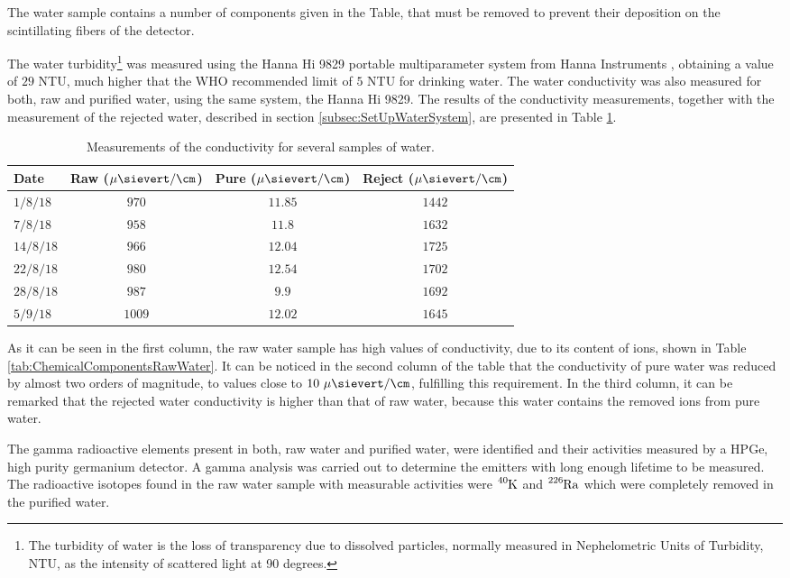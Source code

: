 The water sample contains a number of components given in the Table, that must be removed to prevent their deposition on the scintillating fibers of the detector.

The water turbidity\footnote{The turbidity of water is the loss of transparency due to dissolved particles, normally measured in Nephelometric Units of Turbidity, NTU, as the intensity of scattered light at 90 degrees.} was measured using the Hanna Hi 9829 portable multiparameter system from Hanna Instruments \cite{TurbiditySystem}, obtaining a value of $29$ NTU, much higher that the WHO recommended limit of $5$ NTU for drinking water. The water conductivity was also measured for both, raw and purified water, using the same system, the Hanna Hi 9829. The results of the conductivity measurements, together with the measurement of the rejected water, described in section \ref{subsec:SetUpWaterSystem}, are presented in Table \ref{tab:ConductivityValues}.

\begin{table}[htbp]
\centering{}%
\begin{tabular}{lccc}
\toprule 
Date & Raw ($\mu\sievert/\cm$) & Pure ($\mu\sievert/\cm$) & Reject ($\mu\sievert/\cm$) \tabularnewline
\midrule
\midrule 
$1/8/18$ & $970$ & $11.85$ & $1442$ \tabularnewline
$7/8/18$ & $958$ & $11.8$ & $1632$ \tabularnewline
$14/8/18$ & $966$ & $12.04$ & $1725$ \tabularnewline
$22/8/18$ & $980$ & $12.54$ & $1702$ \tabularnewline
$28/8/18$ & $987$ & $9.9$ & $1692$ \tabularnewline
$5/9/18$ & $1009$ & $12.02$ & $1645$ \tabularnewline
\bottomrule
\end{tabular}
\caption{Measurements of the conductivity for several samples of water.}
\label{tab:ConductivityValues}
\end{table}

As it can be seen in the first column, the raw water sample has high values of conductivity, due to its content of ions, shown in Table \ref{tab:ChemicalComponentsRawWater}. It can be noticed in the second column of the table that the conductivity of pure water was reduced by almost two orders of magnitude, to values close to $10~\mu\sievert/\cm$, fulfilling this requirement. In the third column, it can be remarked that the rejected water conductivity is higher than that of raw water, because this water contains the removed ions from pure water.

The gamma radioactive elements present in both, raw water and purified water, were identified and their activities measured by a HPGe, high purity germanium detector. A gamma analysis was carried out to determine the emitters with long enough lifetime to be measured. The radioactive isotopes found in the raw water sample with measurable activities were $\ce{^{40}K}$ and $\ce{^{226}Ra}$ which were completely removed in the purified water.

